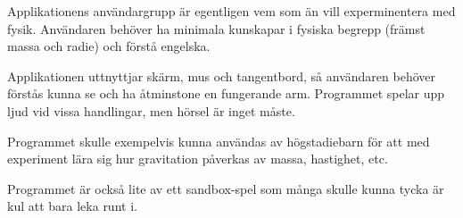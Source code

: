 Applikationens användargrupp är egentligen vem som än vill experminentera
med fysik. Användaren behöver ha minimala kunskapar i fysiska begrepp
(främst massa och radie) och förstå engelska.

Applikationen uttnyttjar skärm, mus och tangentbord, så användaren behöver
förstås kunna se och ha åtminstone en fungerande arm.
Programmet spelar upp ljud vid vissa handlingar, men hörsel är inget
måste.

Programmet skulle exempelvis kunna användas av högstadiebarn för att med 
experiment lära sig hur gravitation påverkas av massa, hastighet, etc.

Programmet är också lite av ett sandbox-spel som många skulle
kunna tycka är kul att bara leka runt i.


